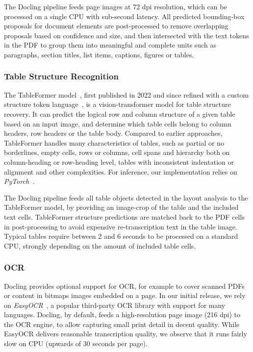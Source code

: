 \documentclass{article}
\begin{document}
The Docling pipeline feeds page images at 72 dpi resolution, which can be processed on a single CPU with sub-second latency. All predicted bounding-box proposals for document elements are post-processed to remove overlapping proposals based on confidence and size, and then intersected with the text tokens in the PDF to group them into meaningful and complete units such as paragraphs, section titles, list items, captions, figures or tables.

\subsubsection*{Table Structure Recognition}
The TableFormer model~\cite{tableformer}, first published in 2022 and since refined with a custom structure token language~\cite{lysak_optimized_2023}, is a vision-transformer model for table structure recovery. It can predict the logical row and column structure of a given table based on an input image, and determine which table cells belong to column headers, row headers or the table body. Compared to earlier approaches, TableFormer handles many characteristics of tables, such as partial or no borderlines, empty cells, rows or columns, cell spans and hierarchy both on column-heading or row-heading level, tables with inconsistent indentation or alignment and other complexities. For inference, our implementation relies on \textit{PyTorch}~\cite{pytorch2}.

The Docling pipeline feeds all table objects detected in the layout analysis to the TableFormer model, by providing an image-crop of the table and the included text cells. TableFormer structure predictions are matched back to the PDF cells in post-processing to avoid expensive re-transcription text in the table image. Typical tables require between 2 and 6 seconds to be processed on a standard CPU, strongly depending on the amount of included table cells.


\subsubsection*{OCR}

Docling provides optional support for OCR, for example to cover scanned PDFs or content in bitmaps images embedded on a page. In our initial release, we rely on \textit{EasyOCR}~\cite{easyocr}, a popular third-party OCR library with support for many languages. Docling, by default, feeds a high-resolution page image (216 dpi) to the OCR engine, to allow capturing small print detail in decent quality. While EasyOCR delivers reasonable transcription quality, we observe that it runs fairly slow on CPU (upwards of 30 seconds per page). 
\end{document}
